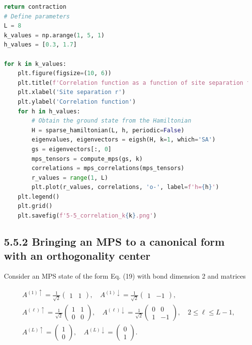 \documentclass[12pt]{article}
\begin{document}
\begin{lstlisting}[language=Python]
    return contraction
# Define parameters
L = 8
k_values = np.arange(1, 5, 1)
h_values = [0.3, 1.7]

for k in k_values:
    plt.figure(figsize=(10, 6))
    plt.title(f'Correlation function as a function of site separation for k={k}')
    plt.xlabel('Site separation r')
    plt.ylabel('Correlation function')
    for h in h_values:
        # Obtain the ground state from the Hamiltonian
        H = sparse_hamiltonian(L, h, periodic=False)
        eigenvalues, eigenvectors = eigsh(H, k=1, which='SA')
        gs = eigenvectors[:, 0]
        mps_tensors = compute_mps(gs, k)
        correlations = mps_correlations(mps_tensors)
        r_values = range(1, L)
        plt.plot(r_values, correlations, 'o-', label=f'h={h}')
    plt.legend()
    plt.grid()
    plt.savefig(f'5-5_correlation_k{k}.png')

\end{lstlisting}
\subsection*{5.5.2 Bringing an MPS to a canonical form with an orthogonality center}
Consider an MPS state of the form Eq. (19) with bond dimension 2 and matrices


\begin{align*}
& A^{(1) \uparrow}=\frac{1}{\sqrt{2}}\left(\begin{array}{ll}
1 & 1
\end{array}\right), \quad A^{(1) \downarrow}=\frac{1}{\sqrt{2}}\left(\begin{array}{ll}
1 & -1
\end{array}\right),  \tag{27}\\
& A^{(\ell) \uparrow}=\frac{1}{\sqrt{2}}\left(\begin{array}{ll}
1 & 1 \\
0 & 0
\end{array}\right), \quad A^{(\ell) \downarrow}=\frac{1}{\sqrt{2}}\left(\begin{array}{cc}
0 & 0 \\
1 & -1
\end{array}\right), \quad 2 \leq \ell \leq L-1,  \tag{28}\\
& A^{(L) \uparrow}=\left(\begin{array}{l}
1 \\
0
\end{array}\right), \quad A^{(L) \downarrow}=\left(\begin{array}{l}
0 \\
1
\end{array}\right) . \tag{29}
\end{align*}
\end{document}
